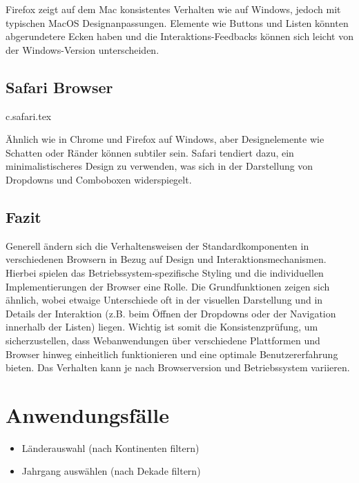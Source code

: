 Firefox zeigt auf dem Mac konsistentes Verhalten wie auf Windows, jedoch mit typischen MacOS Designanpassungen. 
Elemente wie Buttons und Listen könnten abgerundetere Ecken haben und 
die Interaktions-Feedbacks können sich leicht von der Windows-Version unterscheiden.

\clearpage
\subsection{Safari Browser}
{c.safari.tex}

Ähnlich wie in Chrome und Firefox auf Windows, aber Designelemente wie Schatten oder Ränder können subtiler sein. 
Safari tendiert dazu, ein minimalistischeres Design zu verwenden, was sich in der Darstellung von Dropdowns und Comboboxen widerspiegelt.


\clearpage
\subsection{Fazit}

Generell ändern sich die Verhaltensweisen der Standardkomponenten in verschiedenen Browsern in Bezug auf Design und Interaktionsmechanismen. 
Hierbei spielen das Betriebssystem-spezifische Styling und die individuellen Implementierungen der Browser eine Rolle. 
Die Grundfunktionen zeigen sich ähnlich, wobei etwaige Unterschiede oft in der visuellen Darstellung und in Details der Interaktion 
(z.B. beim Öffnen der Dropdowns oder der Navigation innerhalb der Listen) liegen. 
Wichtig ist somit die Konsistenzprüfung, um sicherzustellen, dass Webanwendungen über verschiedene Plattformen
und Browser hinweg einheitlich funktionieren und eine optimale Benutzererfahrung bieten. 
Das Verhalten kann je nach Browserversion und Betriebssystem variieren.

\section{Anwendungsfälle}
\begin{itemize}
    \item Länderauswahl (nach Kontinenten filtern)
    \item Jahrgang auswählen (nach Dekade filtern)
\end{itemize}
